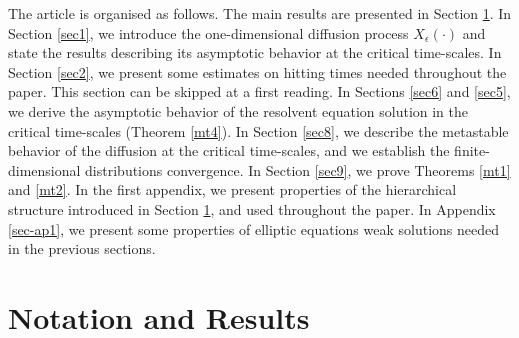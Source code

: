 \documentclass[reqno]{amsart}
\theoremstyle{plain}
\theoremstyle{definition}
\newcounter{as}[section]
\newcommand{\<}{\langle}
\renewcommand{\>}{\rangle}
\begin{document}
The article is organised as follows. The main results are presented in
Section \ref{sec7}. In Section \ref{sec1}, we introduce the
one-dimensional diffusion process $X_\epsilon(\cdot)$ and state the
results describing its asymptotic behavior at the critical
time-scales. In Section \ref{sec2}, we present some estimates on
hitting times needed throughout the paper. This section can be skipped
at a first reading. In Sections \ref{sec6} and \ref{sec5}, we derive
the asymptotic behavior of the resolvent equation solution in the
critical time-scales (Theorem \ref{mt4}). In Section \ref{sec8}, we
describe the metastable behavior of the diffusion at the critical
time-scales, and we establish the finite-dimensional distributions
convergence. In Section \ref{sec9}, we prove Theorems \ref{mt1} and
\ref{mt2}. In the first appendix, we present properties of the
hierarchical structure introduced in Section \ref{sec7}, and used
throughout the paper. In Appendix \ref{sec-ap1}, we present some
properties of elliptic equations weak solutions needed in the previous
sections.



\section{Notation and Results}
\label{sec7}
\end{document}
